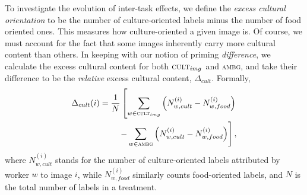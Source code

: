 \documentclass[letterpaper]{article}
\begin{document}
\begin{figure}
\end{figure}
To investigate the evolution of inter-task effects, we define the 
\textit{excess cultural orientation} to be the number of 
culture-oriented labels minus the number of food oriented ones.  This measures
how culture-oriented a given image is.  Of course, we must account for the 
fact that some images inherently carry more 
cultural content than others. In keeping with our notion of priming 
\textit{difference}, we calculate the excess cultural content for 
both $\textsc{cult}_{img}$ and \textsc{ambg}, and take their difference to be
the \textit{relative} excess cultural content, $\Delta_{cult}$.  Formally,
\begin{align}
	\begin{split}
	\Delta_{cult}(i) = \frac{1}{N}\left[ \sum_{w\in\textsc{cult}_{img}} \left(N_{w,cult}^{(i)} - N_{w,food}^{(i)}\right)\right. \\
\left.	- \sum_{w\in\textsc{ambg}} \left(N_{w,cult}^{(i)} - N_{w,food}^{(i)}\right)\right],
	\end{split}
\end{align}
where $N_{w,cult}^{(i)}$ stands for the number of culture-oriented labels 
attributed by worker $w$ to image $i$, while $N_{w,food}^{(i)}$ similarly 
counts food-oriented labels, and $N$ is the total number of labels in a 
treatment.  
\end{document}
